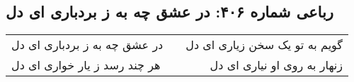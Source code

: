 \begin{center}
\section*{رباعی شماره ۴۰۶: در عشق چه به ز بردباری ای دل}
\label{sec:sh406}
\begin{longtable}{l p{0.5cm} r}
در عشق چه به ز بردباری ای دل
&&
گویم به تو یک سخن زیاری ای دل
\\
هر چند رسد ز یار خواری ای دل
&&
زنهار به روی او نیاری ای دل
\\
\end{longtable}
\end{center}

